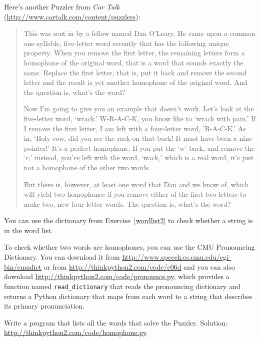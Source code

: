 \documentclass[10pt]{book}
\begin{document}
\begin{exercise}

Here's another Puzzler from {\em Car Talk} 
(\url{http://www.cartalk.com/content/puzzlers}):

\begin{quote}
This was sent in by a fellow named Dan O'Leary. He came upon a common
one-syllable, five-letter word recently that has the following unique
property. When you remove the first letter, the remaining letters form
a homophone of the original word, that is a word that sounds exactly
the same. Replace the first letter, that is, put it back and remove
the second letter and the result is yet another homophone of the
original word. And the question is, what's the word?

Now I'm going to give you an example that doesn't work. Let's look at
the five-letter word, `wrack.' W-R-A-C-K, you know like to `wrack with
pain.' If I remove the first letter, I am left with a four-letter
word, 'R-A-C-K.' As in, `Holy cow, did you see the rack on that buck!
It must have been a nine-pointer!' It's a perfect homophone. If you
put the `w' back, and remove the `r,' instead, you're left with the
word, `wack,' which is a real word, it's just not a homophone of the
other two words.

But there is, however, at least one word that Dan and we know of,
which will yield two homophones if you remove either of the first two
letters to make two, new four-letter words. The question is, what's
the word?
\end{quote}

You can use the dictionary from Exercise~\ref{wordlist2} to check
whether a string is in the word list.

To check whether two words are homophones, you can use the CMU
Pronouncing Dictionary.  You can download it from
\url{http://www.speech.cs.cmu.edu/cgi-bin/cmudict} or from
\url{http://thinkpython2.com/code/c06d} and you can also download
\url{http://thinkpython2.com/code/pronounce.py}, which provides a function
named \verb"read_dictionary" that reads the pronouncing dictionary and
returns a Python dictionary that maps from each word to a string that
describes its primary pronunciation.

Write a program that lists all the words that solve the Puzzler.
Solution: \url{http://thinkpython2.com/code/homophone.py}.

\end{exercise}
\end{document}
